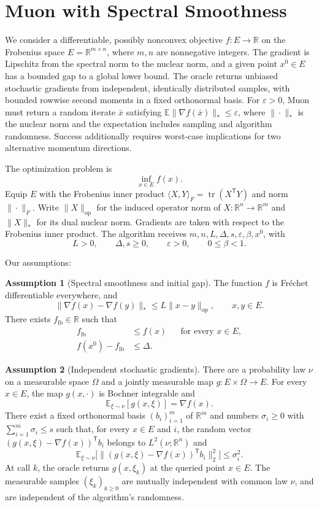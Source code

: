 \documentclass[10pt]{article}
\theoremstyle{definition}
\newtheorem{assumption}{Assumption}
\begin{document}
\section*{Muon with Spectral Smoothness}
We consider a differentiable, possibly nonconvex objective $f:E\to\mathbb{R}$ on the Frobenius space $E=\mathbb{R}^{m\times n}$, where $m,n$ are nonnegative integers. The gradient is Lipschitz from the spectral norm to the nuclear norm, and a given point $x^0\in E$ has a bounded gap to a global lower bound. The oracle returns unbiased stochastic gradients from independent, identically distributed samples, with bounded rowwise second moments in a fixed orthonormal basis. For $\varepsilon>0$, Muon must return a random iterate $\bar{x}$ satisfying $\mathbb{E}\|\nabla f(\bar{x})\|_*\leq\varepsilon$, where $\|\cdot\|_*$ is the nuclear norm and the expectation includes sampling and algorithm randomness. Success additionally requires worst-case implications for two alternative momentum directions.

The optimization problem is
\[
\inf_{x\in E} f(x).
\]
Equip $E$ with the Frobenius inner product $\langle X,Y\rangle_F=\operatorname{tr}(X^{\mathsf T}Y)$ and norm $\|\cdot\|_F$. Write $\|X\|_{\mathrm{op}}$ for the induced operator norm of $X:\mathbb{R}^n\to\mathbb{R}^m$ and $\|X\|_*$ for its dual nuclear norm. Gradients are taken with respect to the Frobenius inner product. The algorithm receives $m,n,L,\Delta,s,\varepsilon,\beta,x^0$, with
\[
L>0,\qquad \Delta,s\geq0,\qquad
\varepsilon>0,\qquad 0\leq\beta<1.
\]

Our assumptions:
\begin{assumption}[Spectral smoothness and initial gap]
The function $f$ is Fr\'echet differentiable everywhere, and
\[
\|\nabla f(x)-\nabla f(y)\|_*
\leq L\|x-y\|_{\mathrm{op}},\qquad x,y\in E.
\]
There exists $f_{\mathrm{lb}}\in\mathbb{R}$ such that
\[
\begin{aligned}
f_{\mathrm{lb}}&\leq f(x) &&\text{for every }x\in E,\\
f(x^0)-f_{\mathrm{lb}}&\leq\Delta.
\end{aligned}
\]
\end{assumption}

\begin{assumption}[Independent stochastic gradients]
There are a probability law $\nu$ on a measurable space $\Omega$ and a jointly measurable map $g:E\times\Omega\to E$. For every $x\in E$, the map $g(x,\cdot)$ is Bochner integrable and
\[
\mathbb{E}_{\xi\sim\nu}[g(x,\xi)]=\nabla f(x).
\]
There exist a fixed orthonormal basis $(b_i)_{i=1}^m$ of $\mathbb{R}^m$ and numbers $\sigma_i\geq0$ with $\sum_{i=1}^m\sigma_i\leq s$ such that, for every $x\in E$ and $i$, the random vector $(g(x,\xi)-\nabla f(x))^{\mathsf T}b_i$ belongs to $L^2(\nu;\mathbb{R}^n)$ and
\[
\mathbb{E}_{\xi\sim\nu}
\bigl[\|(g(x,\xi)-\nabla f(x))^{\mathsf T}b_i\|_2^2\bigr]
\leq\sigma_i^2.
\]
At call $k$, the oracle returns $g(x,\xi_k)$ at the queried point $x\in E$. The measurable samples $(\xi_k)_{k\geq0}$ are mutually independent with common law $\nu$, and are independent of the algorithm's randomness.
\end{assumption}
\end{document}
